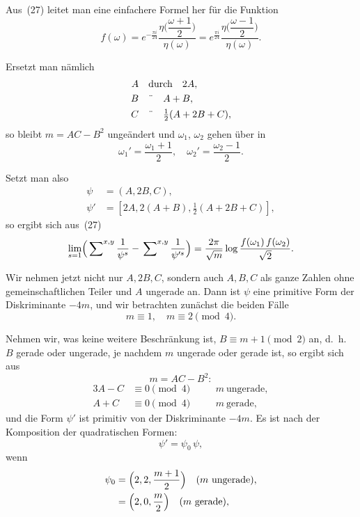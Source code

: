 \documentclass[12pt,a4paper]{article}
\theoremstyle{definition}
\begin{document}
Aus~(27) leitet man eine einfachere Formel her für die Funktion
\[
f(\omega) = e^{-\frac{\pi i}{24}}
\frac{\eta\bigl(\dfrac{\omega+1}{2}\bigr)}{\eta(\omega)}
= e^{\frac{\pi i}{24}}
\frac{\eta\bigl(\dfrac{\omega-1}{2}\bigr)}{\eta(\omega)}.
\]

Ersetzt man nämlich
\begin{alignat*}{3}
A &\quad\text{durch}\quad 2A,\\
B &\quad\text{\"{ }}\quad A + B,\\
C &\quad\text{\"{ }}\quad \tfrac{1}{2}(A + 2B + C),
\end{alignat*}
so bleibt $m = AC - B^{2}$ ungeändert und $\omega_{1}$, $\omega_{2}$ gehen 
über in
\[
\omega_{1}' = \frac{\omega_{1}+1}{2},\quad \omega_{2}' = \frac{\omega_{2}-1}{2}.
\]

Setzt man also
\begin{equation}
\begin{aligned}
\psi &= (A, 2B, C),\\
\psi' &= [2A, 2(A+B), \tfrac{1}{2}(A + 2B + C)],
\end{aligned}
\end{equation}
so ergibt sich aus~(27)
\begin{equation}
\lim_{s=1}\Bigl(\sideset{}{^{x,y}}\sum\frac{1}{\psi^{s}} -
\sideset{}{^{x,y}}\sum\frac{1}{\psi'^{s}}\Bigr) =
\frac{2\pi}{\sqrt{m}}
\log\frac{f(\omega_{1})\,f(\omega_{2})}{\sqrt{2}}.
\end{equation}

Wir nehmen jetzt nicht nur $A, 2B, C$, sondern auch $A, B, C$ als ganze 
Zahlen ohne gemeinschaftlichen Teiler und $A$ ungerade an. Dann ist $\psi$ 
eine primitive Form der Diskriminante $-4m$, und wir betrachten zunächst 
die beiden Fälle
\[
m \equiv 1,\quad m \equiv 2 \pmod 4.
\]

Nehmen wir, was keine weitere Beschränkung ist, $B \equiv m+1 \pmod 2$ an, 
d.~h. $B$ gerade oder ungerade, je nachdem $m$ ungerade oder gerade ist, so 
ergibt sich aus
\[
m = AC - B^{2}:
\]
\begin{alignat*}{3}
A - C &\equiv 0 \pmod 4 &\quad& m\ \text{ungerade},\\
A + C &\equiv 0 \pmod 4 &\quad& m\ \text{gerade},
\end{alignat*}
und die Form $\psi'$ ist primitiv von der Diskriminante $-4m$. Es ist nach 
der Komposition der quadratischen Formen:
\[
\psi' = \psi_{0}\,\psi,
\]
wenn
\begin{align*}
\psi_{0} &= \Bigl(2, 2, \frac{m+1}{2}\Bigr) \quad (m\ \text{ungerade}),\\
&= \Bigl(2, 0, \frac{m}{2}\Bigr) \quad (m\ \text{gerade}),
\end{align*}
\end{document}
